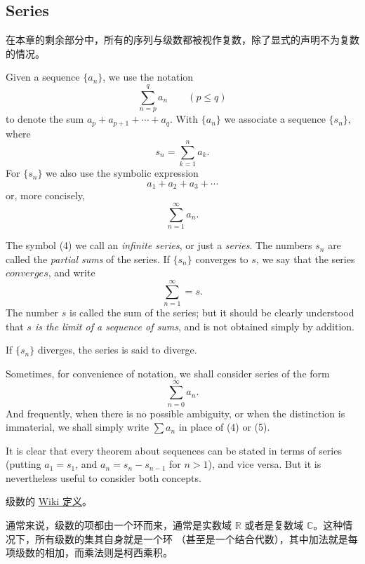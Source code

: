 \documentclass[../poma-notes.tex]{subfiles}
\begin{document}
\subsection*{Series}

在本章的剩余部分中，所有的序列与级数都被视作复数，除了显式的声明不为复数的情况。

\begin{definition}
  Given a sequence $\{a_n\}$, we use the notation
  \[ \sum_{n=p}^{q} a_n \qquad (p \le q) \]
  to denote the sum $ a_p + a_{p+1} + \cdots + a_q$. With $\{a_n\}$ we associate a sequence $\{s_n\}$, where
  \[ s_n = \sum_{k=1}^{n} a_k. \]
  For $\{s_n\}$ we also use the symbolic expression
  \[ a_1 + a_2 + a_3 + \cdots \]
  or, more concisely,
  \begin{equation}
    \sum_{n=1}^{\infty} a_n.
  \end{equation}

  The symbol (4) we call an \textit{infinite series}, or just a \textit{series}. The numbers $s_n$ are called
  the \textit{partial sums} of the series. If $\{s_n\}$ converges to $s$, we say that the series $converges$,
  and write
  \[ \sum_{n=1}^{\infty} = s. \]
  The number $s$ is called the sum of the series; but it should be clearly understood that \textit{$s$ is the
    limit of a sequence of sums}, and is not obtained simply by addition.

  If $\{s_n\}$ diverges, the series is said to diverge.

  Sometimes, for convenience of notation, we shall consider series of the form
  \begin{equation}
    \sum_{n=0}^{\infty} a_n.
  \end{equation}
  And frequently, when there is no possible ambiguity, or when the distinction is immaterial, we shall simply
  write $\sum a_n$ in place of (4) or (5).

  It is clear that every theorem about sequences can be stated in terms of series (putting $a_1 = s_1$, and
  $a_n = s_n - s_{n-1}$ for $n > 1$), and vice versa. But it is nevertheless useful to consider both concepts.
\end{definition}

\begin{anote}\mbox{}\par
  级数的 \href{https://en.wikipedia.org/wiki/Series_(mathematics)}{Wiki 定义}。

  通常来说，级数的项都由一个环而来，通常是实数域 $\mathbb{R}$ 或者是复数域 $\mathbb{C}$。这种情况下，所有级数的集其自身就是一个环
  （甚至是一个结合代数），其中加法就是每项级数的相加，而乘法则是柯西乘积。
\end{anote}
\end{document}
